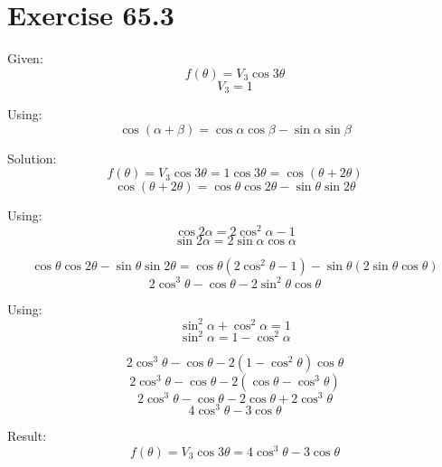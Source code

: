 \documentclass[a4paper, 10pt]{scrartcl}
\begin{document}
\section{Exercise 65.3}

Given:
\[f(\theta) = V_{3}\cos{3\theta}\]
\[V_{3} = 1\]

Using:
\[\cos{(\alpha + \beta)} = \cos{\alpha}\cos{\beta} - \sin{\alpha}\sin{\beta}\]

Solution:
\[f(\theta) = V_{3}\cos{3\theta} = 1\cos{3\theta} = \cos{(\theta + 2\theta)}\]
\[\cos{(\theta + 2\theta)} = \cos{\theta}\cos{2\theta} - \sin{\theta}\sin{2\theta}\]

Using:
\[\cos{2\alpha} = 2\cos^{2}{\alpha} - 1\]
\[\sin{2\alpha} = 2\sin{\alpha}\cos{\alpha}\]

\[\cos{\theta}\cos{2\theta} - \sin{\theta}\sin{2\theta} =
\cos{\theta}(2\cos^{2}{\theta} - 1) - \sin{\theta}(2\sin{\theta}\cos{\theta})\]
\[2\cos^{3}{\theta} - \cos{\theta} - 2\sin^{2}{\theta}\cos{\theta}\]

Using:
\[\sin^{2}{\alpha} + \cos^{2}{\alpha} = 1\]
\[\sin^{2}{\alpha} = 1 - \cos^{2}{\alpha}\]

\[2\cos^{3}{\theta} - \cos{\theta} - 2(1 - \cos^{2}{\theta})\cos{\theta}\]
\[2\cos^{3}{\theta} - \cos{\theta} - 2(\cos{\theta} - \cos^{3}{\theta})\]
\[2\cos^{3}{\theta} - \cos{\theta} - 2\cos{\theta} + 2\cos^{3}{\theta}\]
\[4\cos^{3}{\theta} - 3\cos{\theta}\]

Result:
\[f(\theta) = V_{3}\cos{3\theta} = 4\cos^{3}{\theta} - 3\cos{\theta}\]
\end{document}
